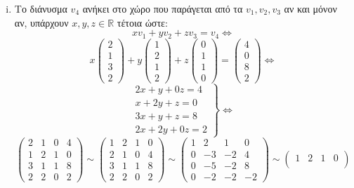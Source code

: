\begin{enumerate}[1.]
\begin{enumerate}[i)]
\item 

Το διάνυσμα $v_4$ ανήκει στο χώρο που παράγεται από τα $v_1,v_2,v_3$ αν και μόνον αν, υπάρχουν $x,y,z\in \mathbb{R}$ τέτοια ώστε:
\[
xv_1+yv_2+zv_3=v_4 \Leftrightarrow 
\]
\[
x\begin{pmatrix}
2 \\ 1 \\ 3 \\2
\end{pmatrix}
+y\begin{pmatrix}
1 \\ 2 \\ 1 \\ 2
\end{pmatrix}
+z\begin{pmatrix}
0 \\ 1 \\ 1 \\ 0
\end{pmatrix}
=\begin{pmatrix}
4 \\ 0 \\ 8 \\2
\end{pmatrix} \Leftrightarrow
\]
\[
\left.
\begin{array}{c}
2x+y+0z=4\\
x+2y+z=0 \\
3x+y+z=8 \\
2x+2y+0z=2
\end{array}
\right\}\Leftrightarrow
\]
\[
\begin{pmatrix}
2 & 1 & 0 & 4 \\
1 & 2 & 1 & 0 \\
3 & 1 & 1 & 8 \\
2 & 2 & 0 & 2 
\end{pmatrix}
\sim
\begin{pmatrix}
1 & 2 & 1 & 0 \\
2 & 1 & 0 & 4 \\
3 & 1 & 1 & 8 \\
2 & 2 & 0 & 2
\end{pmatrix}
\sim 
\begin{pmatrix}
1 & 2 & 1 & 0 \\
0 & -3 & -2 & 4 \\
0 & -5 & -2 & 8 \\
0 & -2 & -2 & -2
\end{pmatrix}
\sim 
\begin{pmatrix}
1 & 2 & 1 & 0 \\

\end{pmatrix}\]
\end{enumerate}
\end{enumerate}
